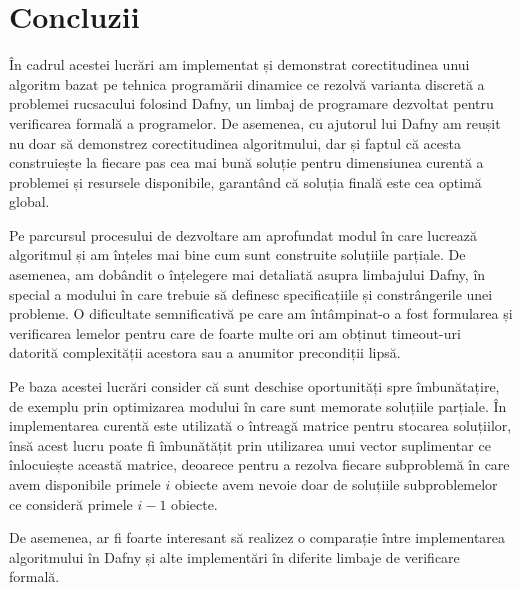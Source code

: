\chapter*{Concluzii} 

\begin{sloppypar}

În cadrul acestei lucrări am implementat și demonstrat corectitudinea unui algoritm  bazat pe tehnica programării dinamice ce rezolvă varianta discretă a problemei rucsacului folosind Dafny, un limbaj de programare dezvoltat pentru verificarea formală a programelor. De asemenea, cu ajutorul lui Dafny am reușit nu doar să demonstrez corectitudinea algoritmului, dar și faptul că acesta construiește la fiecare pas cea mai bună soluție pentru dimensiunea curentă a problemei și resursele disponibile, garantând că soluția finală este cea optimă global. \par
Pe parcursul procesului de dezvoltare am aprofundat modul în care lucrează algoritmul și am înțeles mai bine cum sunt construite soluțiile parțiale. De asemenea, am dobândit o înțelegere mai detaliată asupra limbajului Dafny, în special a modului în care trebuie să definesc specificațiile și constrângerile unei probleme. O dificultate semnificativă pe care am întâmpinat-o a fost formularea și verificarea lemelor pentru care de foarte multe ori am obținut timeout-uri datorită complexității acestora sau a anumitor precondiții lipsă. \par
Pe baza acestei lucrări consider că sunt deschise oportunități spre  îmbunătațire, de exemplu prin optimizarea modului în care sunt memorate soluțiile parțiale. În implementarea curentă este utilizată o întreagă matrice pentru stocarea soluțiilor, însă acest lucru poate fi îmbunătățit prin utilizarea unui vector suplimentar ce înlocuiește această matrice, deoarece pentru a rezolva fiecare subproblemă în care avem disponibile primele $i$ obiecte avem nevoie doar de soluțiile subproblemelor ce consideră primele $i - 1$ obiecte. \par
De asemenea, ar fi foarte interesant să realizez o comparație între implementarea algoritmului în Dafny și alte implementări în diferite limbaje de verificare formală.

\end{sloppypar}
